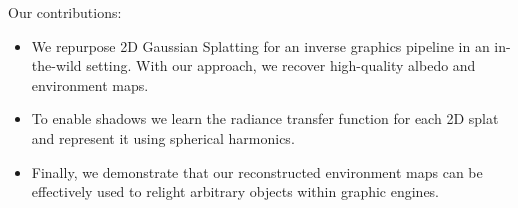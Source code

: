   Our contributions:
  \begin{itemize}
    \item We repurpose 2D Gaussian Splatting for an inverse graphics pipeline in an in-the-wild setting.
          With our approach, we recover high-quality albedo and environment
          maps.
    \item To enable shadows we learn the radiance transfer function for each 2D splat and represent it using spherical harmonics.
    \item Finally, we demonstrate that our reconstructed environment maps can be effectively used to relight arbitrary objects within graphic engines.
  \end{itemize}
